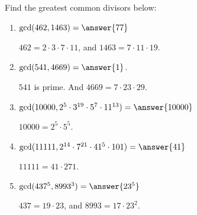 \documentclass[nooutcomes]{ximera}
\begin{document}
\begin{problem}
Find the greatest common divisors below:  
\begin{enumerate}
\item $\gcd(462,1463) = \answer{77}$  
  \begin{hint} $462 = 2\cdot 3\cdot 7\cdot 11$, and  $1463 = 7\cdot 11\cdot 19$.\end{hint}
\item $\gcd(541,4669) = \answer{1}$. 
  \begin{hint}$541$ is prime.  And $4669 = 7\cdot 23\cdot 29$.\end{hint}
\item $\gcd(10000,2^5\cdot 3^{19}\cdot 5^7\cdot 11^{13}) = \answer{10000}$
  \begin{hint}$10000 = 2^5\cdot5^5$.\end{hint}
\item $\gcd(11111,2^{14}\cdot 7^{21}\cdot 41^{5}\cdot 101) = \answer{41}$
  \begin{hint}$11111 = 41\cdot 271$.\end{hint}
\item $\gcd(437^5,8993^3) = \answer{23^5}$
  \begin{hint}$437 = 19\cdot 23$, and $8993=17\cdot 23^2$.\end{hint}
\end{enumerate}
\end{problem}
\end{document}
